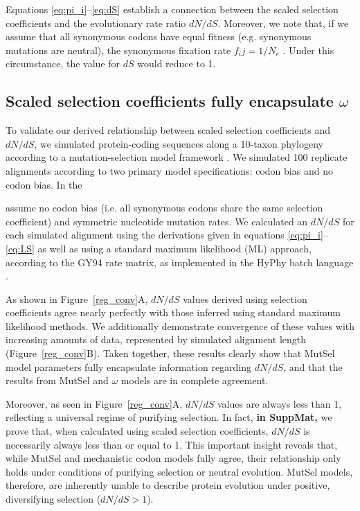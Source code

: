 \documentclass[11pt]{article}
\begin{document}
Equations \eqref{eq:pi_i}--\eqref{eq:dS} establish a connection between the scaled selection coefficients and the evolutionary rate ratio $dN/dS$. Moreover, we note that, if we assume that all synonymous codons have equal fitness (e.g. synonymous mutations are neutral), the synonymous fixation rate $f_ij = 1/N_e$ \cite{CrowKimura1970}. Under this circumstance, the value for $dS$ would reduce to 1.


\subsection*{Scaled selection coefficients fully encapsulate $\omega$}

To validate our derived relationship between scaled selection coefficients and $dN/dS$, we simulated protein-coding sequences along a 10-taxon phylogeny according to a mutation-selection model framework \cite{HalpernBruno1998,SellaHirsh2005}. We simulated 100 replicate alignments according to two primary model specifications: codon bias and no codon bias. In the 




assume no codon bias (i.e. all synonymous codons share the same selection coefficient) and symmetric nucleotide mutation rates. We calculated an $dN/dS$ for each simulated alignment using the derivations given in equations \eqref{eq:pi_i}--\eqref{eq:LS} as well as using a standard maximum likelihood (ML) approach, according to the GY94 \cite{GoldmanYang1994} rate matrix, as implemented in the HyPhy batch language \cite{KosakovskyPondetal2005}.

As shown in Figure~\ref{reg_conv}A, $dN/dS$ values derived using selection coefficients agree nearly perfectly with those inferred using standard maximum likelihood methods. We additionally demonstrate convergence of these values with increasing amounts of data, represented by simulated alignment length (Figure~\ref{reg_conv}B). Taken together, these results clearly show that MutSel model parameters fully encapsulate information regarding $dN/dS$, and that the results from MutSel and $\omega$ models are in complete agreement. 

Moreover, as seen in Figure~\ref{reg_conv}A, $dN/dS$ values are always less than 1, reflecting a universal regime of purifying selection. In fact, \textbf{in SuppMat,} we prove that, when calculated using scaled selection coefficients, $dN/dS$ is necessarily always less than or equal to 1. This important insight reveals that, while MutSel and mechanistic codon models fully agree, their relationship only holds under conditions of purifying selection or neutral evolution. MutSel models, therefore, are inherently unable to describe protein evolution under positive, diversifying selection ($dN/dS > 1$).
\end{document}
